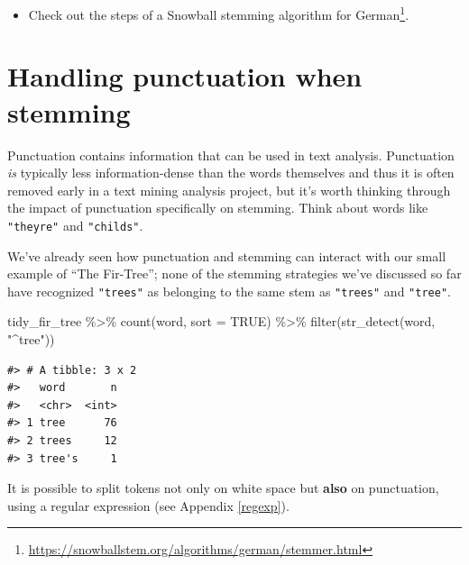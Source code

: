 \documentclass[
]{krantz}
\makeatletter
\newenvironment{Shaded}{\begin{snugshade}}{\end{snugshade}}
\newcommand{\AttributeTok}[1]{\textcolor[rgb]{0.77,0.63,0.00}{#1}}
\newcommand{\ConstantTok}[1]{\textcolor[rgb]{0.00,0.00,0.00}{#1}}
\newcommand{\FunctionTok}[1]{\textcolor[rgb]{0.00,0.00,0.00}{#1}}
\newcommand{\NormalTok}[1]{#1}
\newcommand{\SpecialCharTok}[1]{\textcolor[rgb]{0.00,0.00,0.00}{#1}}
\newcommand{\StringTok}[1]{\textcolor[rgb]{0.31,0.60,0.02}{#1}}
\DeclareRobustCommand{\href}[2]{#2\footnote{\url{#1}}}
\renewcommand{\href}[2]{#2\footnote{\url{#1}}}
\newenvironment{kframe}{%
\medskip{}
\setlength{\fboxsep}{.8em}
 \def\at@end@of@kframe{}%
 \ifinner\ifhmode%
  \def\at@end@of@kframe{\end{minipage}}%
  \begin{minipage}{\columnwidth}%
 \fi\fi%
 \def\FrameCommand##1{\hskip\@totalleftmargin \hskip-\fboxsep
 \colorbox{shadecolor}{##1}\hskip-\fboxsep
     \hskip-\linewidth \hskip-\@totalleftmargin \hskip\columnwidth}%
 \MakeFramed {\advance\hsize-\width
   \@totalleftmargin\z@ \linewidth\hsize
   \@setminipage}}%
 {\par\unskip\endMakeFramed%
 \at@end@of@kframe}
\renewenvironment{Shaded}{\begin{kframe}}{\end{kframe}}
\newenvironment{rmdblock}[1]
  {\begin{shaded*}
  \begin{itemize}[left = -1cm, labelsep = 1cm]
  \renewcommand{\labelitemi}{
    \raisebox{-.7\height}[0pt][0pt]{
      {\setkeys{Gin}{width=3em,keepaspectratio}\texttt{[image: images/\#1]}}
    }
  }
 
  \item
  }
  {
  \end{itemize}
  \end{shaded*}
  }
\newenvironment{rmdwarning}
  {\begin{rmdblock}{warning}}
  {\end{rmdblock}}
\makeatother
\begin{document}
\begin{rmdwarning}
Check out the
\href{https://snowballstem.org/algorithms/german/stemmer.html}{steps of
a Snowball stemming algorithm for German}.
\end{rmdwarning}


\hypertarget{handling-punctuation-when-stemming}{%
\section{Handling punctuation when stemming}\label{handling-punctuation-when-stemming}}

Punctuation contains information that can be used in text analysis. Punctuation \emph{is} typically less information-dense than the words themselves and thus it is often removed early in a text mining analysis project, but it's worth thinking through the impact of punctuation specifically on stemming. Think about words like \texttt{"they\textquotesingle{}re"} and \texttt{"child\textquotesingle{}s"}.

We've already seen how punctuation and stemming can interact with our small example of ``The Fir-Tree''; none of the stemming strategies we've discussed so far have recognized \texttt{"tree\textquotesingle{}s"} as belonging to the same stem as \texttt{"trees"} and \texttt{"tree"}.

\begin{Shaded}
\begin{Highlighting}[]
\NormalTok{tidy\_fir\_tree }\SpecialCharTok{\%\textgreater{}\%}
  \FunctionTok{count}\NormalTok{(word, }\AttributeTok{sort =} \ConstantTok{TRUE}\NormalTok{) }\SpecialCharTok{\%\textgreater{}\%}
  \FunctionTok{filter}\NormalTok{(}\FunctionTok{str\_detect}\NormalTok{(word, }\StringTok{"\^{}tree"}\NormalTok{))}
\end{Highlighting}
\end{Shaded}

\begin{verbatim}
#> # A tibble: 3 x 2
#>   word       n
#>   <chr>  <int>
#> 1 tree      76
#> 2 trees     12
#> 3 tree's     1
\end{verbatim}

It is possible to split tokens not only on white space but \textbf{also} on punctuation, using a regular expression (see Appendix \ref{regexp}).
\end{document}
